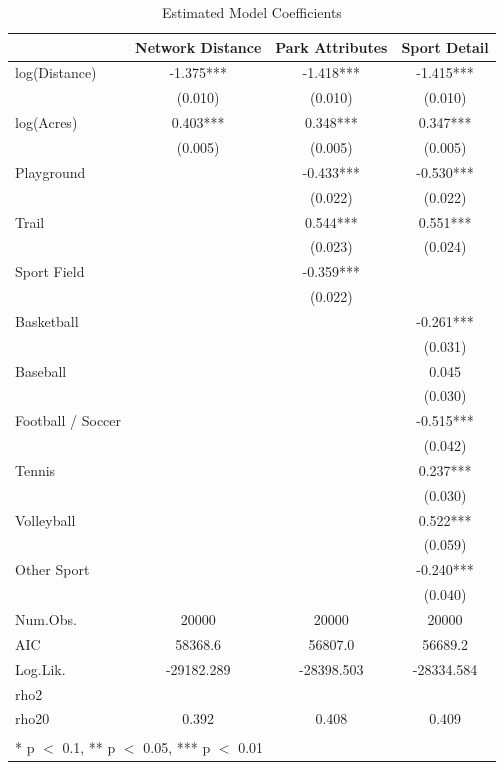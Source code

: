 \documentclass[3p, authoryear, review]{elsarticle} %
\begin{document}
\begin{table}

\caption{\label{tab:base-modelsummary}Estimated Model Coefficients}
\centering
\begin{tabular}[t]{lccc}
\toprule
  & Network Distance & Park Attributes & Sport Detail\\
\midrule
log(Distance) & -1.375*** & -1.418*** & -1.415***\\
 & (0.010) & (0.010) & (0.010)\\
log(Acres) & 0.403*** & 0.348*** & 0.347***\\
 & (0.005) & (0.005) & (0.005)\\
Playground &  & -0.433*** & -0.530***\\
 &  & (0.022) & (0.022)\\
Trail &  & 0.544*** & 0.551***\\
 &  & (0.023) & (0.024)\\
Sport Field &  & -0.359*** & \\
 &  & (0.022) & \\
Basketball &  &  & -0.261***\\
 &  &  & (0.031)\\
Baseball &  &  & 0.045\\
 &  &  & \vphantom{1} (0.030)\\
Football / Soccer &  &  & -0.515***\\
 &  &  & (0.042)\\
Tennis &  &  & 0.237***\\
 &  &  & (0.030)\\
Volleyball &  &  & 0.522***\\
 &  &  & (0.059)\\
Other Sport &  &  & -0.240***\\
 &  &  & (0.040)\\
\midrule
Num.Obs. & 20000 & 20000 & 20000\\
AIC & 58368.6 & 56807.0 & 56689.2\\
Log.Lik. & -29182.289 & -28398.503 & -28334.584\\
rho2 &  &  & \\
rho20 & 0.392 & 0.408 & 0.409\\
\bottomrule
\multicolumn{4}{l}{\textsuperscript{} * p $<$ 0.1, ** p $<$ 0.05, *** p $<$ 0.01}\\
\end{tabular}
\end{table}
\end{document}
